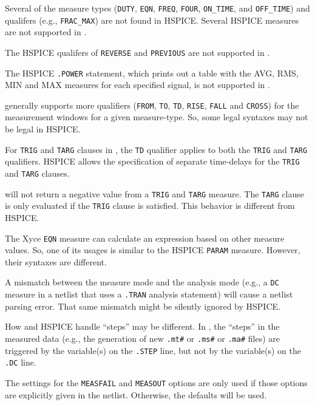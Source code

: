 \begin{XyceItemize}
  \item  Several of the \Xyce{} measure types ({\tt DUTY}, {\tt EQN}, {\tt FREQ},
         {\tt FOUR}, {\tt ON\_TIME}, and {\tt OFF\_TIME}) and qualifers 
         (e.g., {\tt FRAC\_MAX}) are not found in HSPICE.  Several HSPICE measures 
         are not supported in \Xyce{}.
  \item The HSPICE qualifers of {\tt REVERSE} and {\tt PREVIOUS} are not supported in \Xyce{}.
  \item The HSPICE {\tt .POWER} statement, which  prints out a table with the
        AVG, RMS, MIN and MAX measures for each specified signal, is not supported in \Xyce{}.
  \item \Xyce{} generally supports more qualifiers ({\tt FROM},  {\tt TO}, {\tt TD},
        {\tt RISE}, {\tt FALL} and {\tt CROSS}) for the measurement windows for
        a given measure-type.  So, some legal \Xyce{} syntaxes may not be legal in 
        HSPICE. 
  \item For {\tt TRIG} and {\tt TARG} clauses in \Xyce{}, the {\tt TD} qualifier applies 
        to both the {\tt TRIG} and {\tt TARG} qualifiers.  HSPICE allows the
        specification of separate time-delays for the {\tt TRIG} and {\tt TARG} 
        clauses.
  \item \Xyce{} will not return a negative value from a {\tt TRIG} and {\tt TARG}
        measure.  The {\tt TARG} clause is only evaluated if the {\tt TRIG} clause
        is satisfied.  This behavior is different from HSPICE.
  \item The Xyce {\tt EQN} measure can calculate an expression based on other measure 
        values.  So, one of its usages is similar to the HSPICE {\tt PARAM} measure.  
        However, their syntaxes are different.
  \item A mismatch between the measure mode and the analysis mode (e.g., a {\tt DC} measure 
        in a netlist that uses a {\tt .TRAN} analysis statement) will cause a \Xyce{} netlist 
        parsing error.  That same mismatch might be silently ignored by HSPICE.
  \item How \Xyce{} and HSPICE handle ``steps'' may be different.  In \Xyce{}, the
        ``steps'' in the measured data (e.g., the generation of  new \texttt{.mt\#}
        or \texttt{.ms\#} or \texttt{.ma\#} files) are triggered by the variable(s) on 
        the {\tt .STEP} line, but not by the variable(s) on the {\tt .DC} line.
  \item The settings for the \texttt{MEASFAIL} and \texttt{MEASOUT} options are only used
        if those options are explicitly given in the netlist.  Otherwise, the \Xyce{}
        defaults will be used.
\end{XyceItemize}

